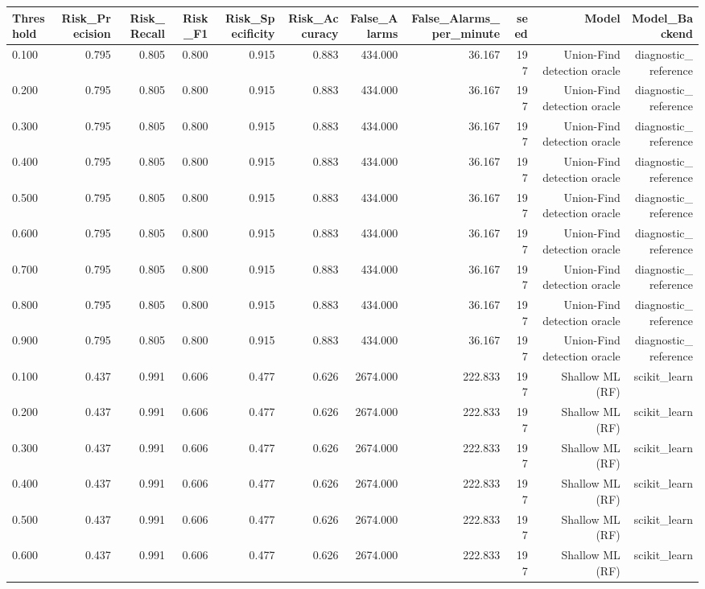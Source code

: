 \begin{tabular}{lrrrrrrrrrr}
\toprule
Threshold & Risk\_Precision & Risk\_Recall & Risk\_F1 & Risk\_Specificity & Risk\_Accuracy & False\_Alarms & False\_Alarms\_per\_minute & seed & Model & Model\_Backend \\
\midrule
0.100 & 0.795 & 0.805 & 0.800 & 0.915 & 0.883 & 434.000 & 36.167 & 197 & Union-Find detection oracle & diagnostic\_reference \\
0.200 & 0.795 & 0.805 & 0.800 & 0.915 & 0.883 & 434.000 & 36.167 & 197 & Union-Find detection oracle & diagnostic\_reference \\
0.300 & 0.795 & 0.805 & 0.800 & 0.915 & 0.883 & 434.000 & 36.167 & 197 & Union-Find detection oracle & diagnostic\_reference \\
0.400 & 0.795 & 0.805 & 0.800 & 0.915 & 0.883 & 434.000 & 36.167 & 197 & Union-Find detection oracle & diagnostic\_reference \\
0.500 & 0.795 & 0.805 & 0.800 & 0.915 & 0.883 & 434.000 & 36.167 & 197 & Union-Find detection oracle & diagnostic\_reference \\
0.600 & 0.795 & 0.805 & 0.800 & 0.915 & 0.883 & 434.000 & 36.167 & 197 & Union-Find detection oracle & diagnostic\_reference \\
0.700 & 0.795 & 0.805 & 0.800 & 0.915 & 0.883 & 434.000 & 36.167 & 197 & Union-Find detection oracle & diagnostic\_reference \\
0.800 & 0.795 & 0.805 & 0.800 & 0.915 & 0.883 & 434.000 & 36.167 & 197 & Union-Find detection oracle & diagnostic\_reference \\
0.900 & 0.795 & 0.805 & 0.800 & 0.915 & 0.883 & 434.000 & 36.167 & 197 & Union-Find detection oracle & diagnostic\_reference \\
0.100 & 0.437 & 0.991 & 0.606 & 0.477 & 0.626 & 2674.000 & 222.833 & 197 & Shallow ML (RF) & scikit\_learn \\
0.200 & 0.437 & 0.991 & 0.606 & 0.477 & 0.626 & 2674.000 & 222.833 & 197 & Shallow ML (RF) & scikit\_learn \\
0.300 & 0.437 & 0.991 & 0.606 & 0.477 & 0.626 & 2674.000 & 222.833 & 197 & Shallow ML (RF) & scikit\_learn \\
0.400 & 0.437 & 0.991 & 0.606 & 0.477 & 0.626 & 2674.000 & 222.833 & 197 & Shallow ML (RF) & scikit\_learn \\
0.500 & 0.437 & 0.991 & 0.606 & 0.477 & 0.626 & 2674.000 & 222.833 & 197 & Shallow ML (RF) & scikit\_learn \\
0.600 & 0.437 & 0.991 & 0.606 & 0.477 & 0.626 & 2674.000 & 222.833 & 197 & Shallow ML (RF) & scikit\_learn \\

\end{tabular}
